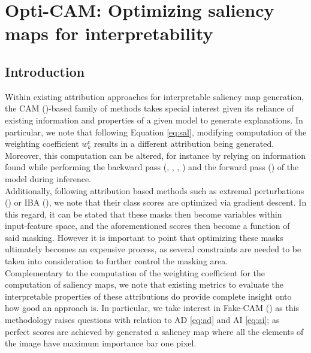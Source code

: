 \chapter{Opti-CAM: Optimizing saliency maps for interpretability}
\chaptertoc{}
\label{ch:opticam}
\section{Introduction}
\noindent Within existing attribution approaches for interpretable saliency map generation, the CAM 
(\cite{zhou2016learning})-based family of methods takes special interest given its reliance of
existing  information and properties of a given model to generate explanations. In particular, we 
note that following Equation \ref{eq:sal}, modifying computation of the weighting coefficient 
$w_k^c$ results in a different attribution being generated. Moreover, this computation can be altered,
 for instance by relying on information found while performing the backward pass 
 (\cite{selvaraju2017grad}, \cite{chattopadhay2018grad}, \cite{axiombased}, 
 \cite{smilkov2017smoothgrad}) and the forward pass (\cite{wang2020score}) of the model during 
 inference.\\

\noindent Additionally, following attribution based methods such as extremal perturbations 
(\cite{fong2019understanding}) or IBA (\cite{schulz2020restricting}), 
we note that their class scores are optimized via gradient descent. In this regard, it can 
be stated that these masks then become variables within input-feature space, and the aforementioned 
scores then become a function of said masking. However it is important to point that optimizing 
these masks ultimately becomes an expensive process, as several constraints are needed 
to be taken into consideration to further control the masking area.\\

\noindent Complementary to the computation of the weighting coefficient for the computation of 
saliency maps, we note that existing metrics to evaluate the interpretable properties of these 
attributions do provide complete insight onto how good an approach is. In particular, we take 
interest in Fake-CAM (\cite{poppi2021revisiting}) as this methodology raises questions with 
relation to AD \ref{eq:ad} and AI \ref{eq:ai}; as perfect scores are achieved by generated a 
saliency map where all the elements of the image have maximum importance bar one pixel.\\

